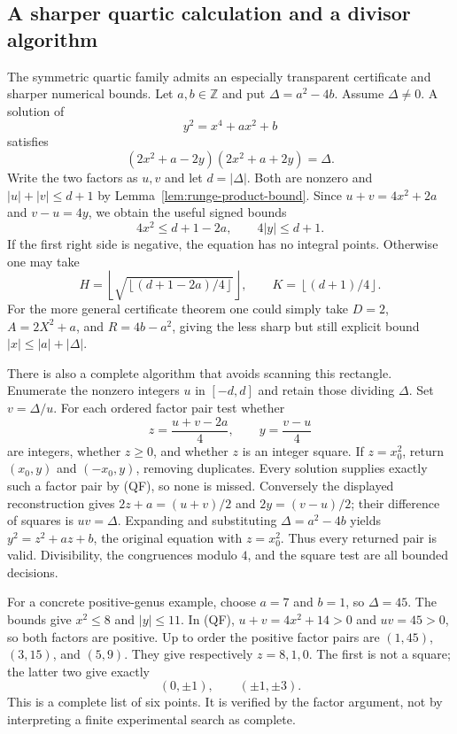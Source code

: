 \subsection{A sharper quartic calculation and a divisor algorithm}

The symmetric quartic family admits an especially transparent certificate
and sharper numerical bounds.  Let $a,b\in\mathbb Z$ and put
$\Delta=a^2-4b$.  Assume $\Delta\neq0$.  A solution of
\[
                         y^2=x^4+ax^2+b
\]
satisfies
\[
 (2x^2+a-2y)(2x^2+a+2y)=\Delta.
\tag{QF}
\]
Write the two factors as $u,v$ and let $d=|\Delta|$.
Both are nonzero and $|u|+|v|\leq d+1$ by
Lemma~\ref{lem:runge-product-bound}.  Since
$u+v=4x^2+2a$ and $v-u=4y$, we obtain the useful signed bounds
\[
                    4x^2\leq d+1-2a,
                 \qquad 4|y|\leq d+1.
\tag{QB}
\]
If the first right side is negative, the equation has no integral points.
Otherwise one may take
\[
 H=\left\lfloor\sqrt{\left\lfloor(d+1-2a)/4\right\rfloor}\right\rfloor,
 \qquad K=\left\lfloor(d+1)/4\right\rfloor.
\]
For the more general certificate theorem one could simply take
$D=2$, $A=2X^2+a$, and $R=4b-a^2$, giving the less sharp but still explicit
bound $|x|\leq |a|+|\Delta|$.

There is also a complete algorithm that avoids scanning this rectangle.
Enumerate the nonzero integers $u$ in $[-d,d]$ and retain those dividing
$\Delta$.  Set $v=\Delta/u$.  For each ordered factor pair test whether
\[
           z=\frac{u+v-2a}{4},\qquad y=\frac{v-u}{4}
\]
are integers, whether $z\geq0$, and whether $z$ is an integer square.
If $z=x_0^2$, return $(x_0,y)$ and $(-x_0,y)$, removing duplicates.
Every solution supplies exactly such a factor pair by (QF), so none is
missed.  Conversely the displayed reconstruction gives
$2z+a=(u+v)/2$ and $2y=(v-u)/2$; their difference of squares is
$uv=\Delta$.  Expanding and substituting $\Delta=a^2-4b$ yields
$y^2=z^2+az+b$, the original equation with $z=x_0^2$.  Thus every returned
pair is valid.  Divisibility, the congruences modulo $4$, and the square
test are all bounded decisions.

For a concrete positive-genus example, choose $a=7$ and $b=1$, so
$\Delta=45$.  The bounds give $x^2\leq8$ and $|y|\leq11$.
In (QF), $u+v=4x^2+14>0$ and $uv=45>0$, so both factors are positive.
Up to order the positive factor pairs are
$(1,45)$, $(3,15)$, and $(5,9)$.  They give respectively
$z=8,1,0$.  The first is not a square; the latter two give exactly
\[
                         (0,\pm1),\qquad(\pm1,\pm3).
\]
This is a complete list of six points.  It is verified by the factor
argument, not by interpreting a finite experimental search as complete.

